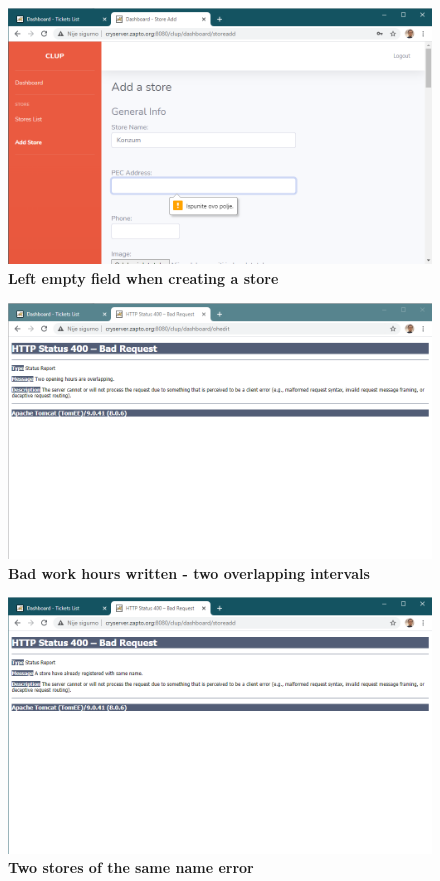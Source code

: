 \begin{figure}[!htb]
\centering
\includegraphics[width=\textwidth]{Images/FieldEmpty}
\captionsetup{justification=centering}
\caption{\label{fig:desktoperr1}\textbf{Left empty field when creating a store}}
\end{figure}
\begin{figure}[!htb]
\centering
\includegraphics[width=\textwidth]{Images/BadHours}
\captionsetup{justification=centering}
\caption{\label{fig:desktoperr2}\textbf{Bad work hours written - two overlapping intervals}}
\end{figure}
\begin{figure}[!htb]
\centering
\includegraphics[width=\textwidth]{Images/SameName}
\captionsetup{justification=centering}
\caption{\label{fig:desktoperr3}\textbf{Two stores of the same name error}}
\end{figure}

